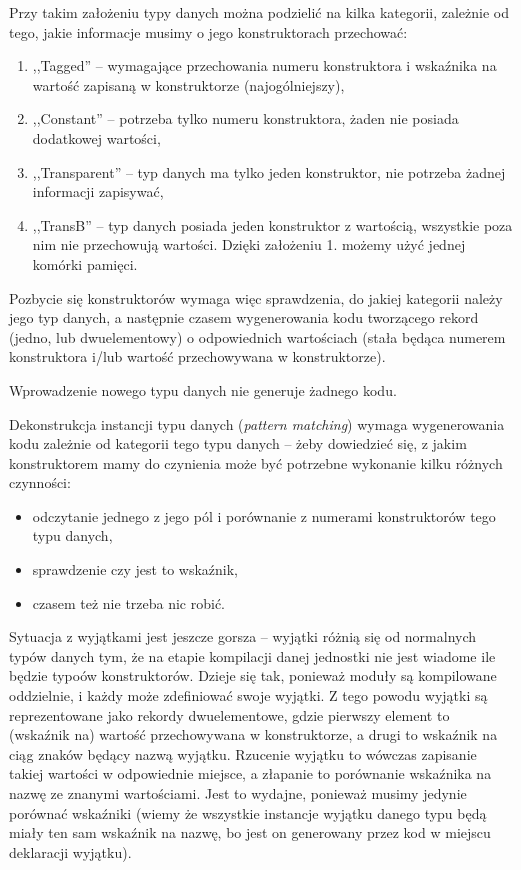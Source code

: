 \documentclass[11pt]{scrartcl}
\begin{document}
Przy takim założeniu typy danych można podzielić na kilka kategorii, zależnie od
tego, jakie informacje musimy o jego konstruktorach przechować:

\begin{enumerate}
\item ,,Tagged'' -- wymagające przechowania numeru konstruktora i wskaźnika na
  wartość zapisaną w konstruktorze (najogólniejszy),
\item ,,Constant'' -- potrzeba tylko numeru konstruktora, żaden nie posiada
  dodatkowej wartości,
\item ,,Transparent'' -- typ danych ma tylko jeden konstruktor, nie potrzeba żadnej
  informacji zapisywać,
\item ,,TransB'' -- typ danych posiada jeden konstruktor z wartością, wszystkie
  poza nim nie przechowują wartości. Dzięki założeniu 1. możemy użyć jednej komórki
  pamięci.
\end{enumerate}

Pozbycie się konstruktorów wymaga więc sprawdzenia, do jakiej kategorii należy
jego typ danych, a następnie czasem wygenerowania kodu tworzącego rekord (jedno, lub
dwuelementowy) o odpowiednich wartościach (stała będąca numerem konstruktora
i/lub wartość przechowywana w konstruktorze).

Wprowadzenie nowego typu danych nie generuje żadnego kodu.

Dekonstrukcja instancji typu danych (\textit{pattern matching}) wymaga wygenerowania kodu
zależnie od kategorii tego typu danych -- żeby dowiedzieć się, z jakim
konstruktorem mamy do czynienia może być potrzebne wykonanie kilku różnych
czynności:
\begin{itemize}
\item odczytanie jednego z jego pól i porównanie z numerami konstruktorów tego
  typu danych,
\item sprawdzenie czy jest to wskaźnik,
\item czasem też nie trzeba nic robić.
\end{itemize}

Sytuacja z wyjątkami jest jeszcze gorsza -- wyjątki różnią się od normalnych
typów danych tym, że na etapie kompilacji danej jednostki nie jest wiadome ile
będzie typoów
konstruktorów. Dzieje się tak, ponieważ moduły są kompilowane oddzielnie, i
każdy może zdefiniować swoje wyjątki. Z tego powodu wyjątki są reprezentowane
jako rekordy dwuelementowe, gdzie pierwszy element to (wskaźnik na) wartość
przechowywana w konstruktorze, a drugi to wskaźnik na ciąg znaków będący nazwą
wyjątku. Rzucenie wyjątku to wówczas zapisanie takiej wartości w odpowiednie
miejsce, a złapanie to porównanie wskaźnika na nazwę ze znanymi wartościami.
Jest to wydajne, ponieważ musimy jedynie porównać wskaźniki (wiemy że wszystkie
instancje wyjątku danego typu będą miały ten sam wskaźnik na nazwę, bo jest on
generowany przez kod w miejscu deklaracji wyjątku).
\end{document}

